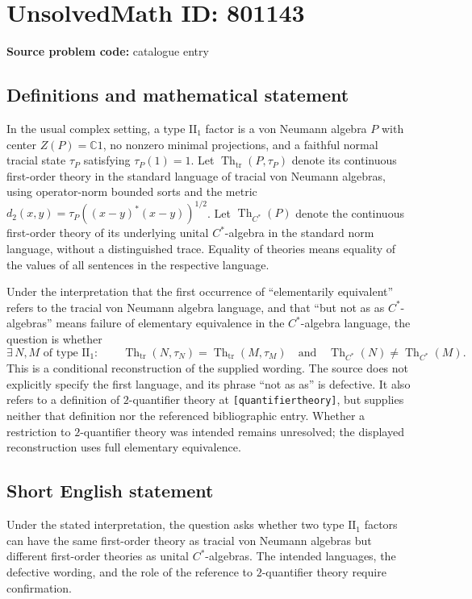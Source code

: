 \documentclass[11pt]{article}
\newcommand{\C}{\mathbb{C}}
\begin{document}
\section*{UnsolvedMath ID: 801143}
\textbf{Source problem code:} catalogue entry
\subsection{Definitions and mathematical statement}
In the usual complex setting, a type \(\mathrm{II}_1\) factor is a von Neumann algebra \(P\) with center \(Z(P)=\C 1\), no nonzero minimal projections, and a faithful normal tracial state \(\tau_P\) satisfying \(\tau_P(1)=1\). Let \(\operatorname{Th}_{\mathrm{tr}}(P,\tau_P)\) denote its continuous first-order theory in the standard language of tracial von Neumann algebras, using operator-norm bounded sorts and the metric \(d_2(x,y)=\tau_P((x-y)^*(x-y))^{1/2}\). Let \(\operatorname{Th}_{C^*}(P)\) denote the continuous first-order theory of its underlying unital \(C^*\)-algebra in the standard norm language, without a distinguished trace. Equality of theories means equality of the values of all sentences in the respective language.

Under the interpretation that the first occurrence of ``elementarily equivalent'' refers to the tracial von Neumann algebra language, and that ``but not as as \(C^*\)-algebras'' means failure of elementary equivalence in the \(C^*\)-algebra language, the question is whether
\[
\exists\, N,M\text{ of type }\mathrm{II}_1:\qquad
\operatorname{Th}_{\mathrm{tr}}(N,\tau_N)=\operatorname{Th}_{\mathrm{tr}}(M,\tau_M)
\quad\text{and}\quad
\operatorname{Th}_{C^*}(N)\ne\operatorname{Th}_{C^*}(M).
\]
This is a conditional reconstruction of the supplied wording. The source does not explicitly specify the first language, and its phrase ``not as as'' is defective. It also refers to a definition of \(2\)-quantifier theory at \texttt{[quantifiertheory]}, but supplies neither that definition nor the referenced bibliographic entry. Whether a restriction to \(2\)-quantifier theory was intended remains unresolved; the displayed reconstruction uses full elementary equivalence.
\subsection{Short English statement}
Under the stated interpretation, the question asks whether two type \(\mathrm{II}_1\) factors can have the same first-order theory as tracial von Neumann algebras but different first-order theories as unital \(C^*\)-algebras. The intended languages, the defective wording, and the role of the reference to \(2\)-quantifier theory require confirmation.
\end{document}

